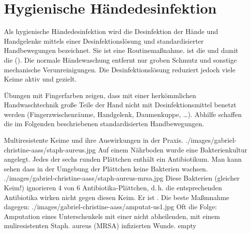 \section{Hygienische Händedesinfektion}
\label{topic:hygienische-haendedesinfektion}

{\TxBeschreibung}
{Als hygienische Händedesinfektion wird die Desinfektion der
Hände und Handgelenke mittels einer Desinfektionslösung und
standardisierter Handbewegungen bezeichnet. Sie ist eine
Routinemaßnahme.
 ist  die 
 und damit die  (). Die normale Händewaschung
        entfernt nur groben Schmutz und sonstige mechanische Verunreinigungen. Die
Desinfektionslösung reduziert jedoch viele
Keime aktiv und gezielt.
        


Übungen mit Fingerfarben
zeigen, dass mit einer herkömmlichen Handwaschtechnik große
Teile der Hand nicht mit Desinfektionsmittel
benetzt werden (Fingerzwischenräume,
Handgelenk, Daumenkuppe, \ldots). Abhilfe schaffen die im
Folgenden beschriebenen standardisierten Handbewegungen.}
{}
{}
{}
{}



\begin{PictureSeriesWide}{}{ Multiresistente
Keime und ihre Auswirkungen in der Praxis. 
}
{./images/gabriel-christine-aass/staph-aureus.jpg}
{Auf einem Nährboden wurde eine Bakterienkultur angelegt.
Jedes der sechs runden Plättchen enthält ein Antibiotikum.
Man kann sehen dass in der Umgebung der Plättchen keine
Bakterien
wachsen.}
{./images/gabriel-christine-aass/staph-aureus-mrsa.jpg}
{Diese Bakterien (gleicher Keim!) ignorieren 4 von 6
Antibiotika-Plättchen, d.\,h. die entsprechenden Antibiotika wirken
nicht gegen diesen Keim. Er ist . Die
beste Maßmnahme dagegen: }
{./images/gabriel-christine-aass/amputat-us1.jpg}
{Oft die Folge: Amputation eines Unterschenkels mit einer nicht
abheilenden, mit einem muliresistenten
Staph. aureus (MRSA) infizierten Wunde.}
{empty}
{}
\end{PictureSeriesWide}


